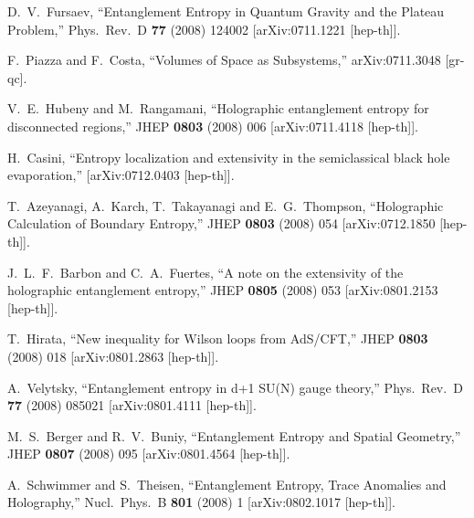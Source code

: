 \documentclass[12pt]{article}
\begin{document}
\begin{thebibliography}{99}
  D.~V.~Fursaev,
  ``Entanglement Entropy in Quantum Gravity and the Plateau Problem,''
  Phys.\ Rev.\  D {\bf 77} (2008) 124002
  [arXiv:0711.1221 [hep-th]].

  F.~Piazza and F.~Costa,
  ``Volumes of Space as Subsystems,''
  arXiv:0711.3048 [gr-qc].

  V.~E.~Hubeny and M.~Rangamani,
  ``Holographic entanglement entropy for disconnected regions,''
  JHEP {\bf 0803} (2008) 006
  [arXiv:0711.4118 [hep-th]].

  H.~Casini,
  ``Entropy localization and extensivity in the semiclassical black hole
  evaporation,''
  [arXiv:0712.0403 [hep-th]].

  T.~Azeyanagi, A.~Karch, T.~Takayanagi and E.~G.~Thompson,
  ``Holographic Calculation of Boundary Entropy,''
  JHEP {\bf 0803} (2008) 054
  [arXiv:0712.1850 [hep-th]].

  J.~L.~F.~Barbon and C.~A.~Fuertes,
  ``A note on the extensivity of the holographic entanglement entropy,''
  JHEP {\bf 0805} (2008) 053
  [arXiv:0801.2153 [hep-th]].

  T.~Hirata,
  ``New inequality for Wilson loops from AdS/CFT,''
  JHEP {\bf 0803} (2008) 018
  [arXiv:0801.2863 [hep-th]].

  A.~Velytsky,
  ``Entanglement entropy in d+1 SU(N) gauge theory,''
  Phys.\ Rev.\  D {\bf 77} (2008) 085021
  [arXiv:0801.4111 [hep-th]].

  M.~S.~Berger and R.~V.~Buniy,
  ``Entanglement Entropy and Spatial Geometry,''
  JHEP {\bf 0807} (2008) 095
  [arXiv:0801.4564 [hep-th]].

  A.~Schwimmer and S.~Theisen,
  ``Entanglement Entropy, Trace Anomalies and Holography,''
  Nucl.\ Phys.\  B {\bf 801} (2008) 1
  [arXiv:0802.1017 [hep-th]].


\end{thebibliography}
\end{document}
